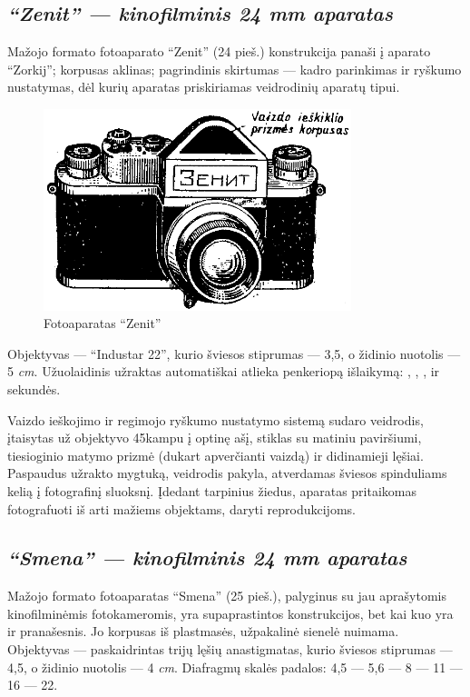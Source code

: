 \documentclass[12pt]{book}
\begin{document}
		\subsection*{\textit{``Zenit'' --- kinofilminis 24  mm aparatas}}
			Mažojo formato fotoaparato ``Zenit'' (24 pieš.) konstrukcija panaši į aparato ``Zorkij''; korpusas aklinas; pagrindinis skirtumas --- kadro parinkimas ir ryškumo nustatymas, dėl kurių aparatas priskiriamas veidrodinių aparatų tipui.
			\begin{figure}[h]
				\centering
				\includegraphics[width=0.8\textwidth]{24-pav}
				\caption{Fotoaparatas ``Zenit''}
				\label{fig:24}
			\end{figure}

			Objektyvas --- ``Industar 22'', kurio šviesos stiprumas --- 3,5, o židinio nuotolis --- 5 \textit{cm}. Užuolaidinis užraktas automatiškai atlieka penkeriopą išlaikymą: , , ,  ir  sekundės.

			Vaizdo ieškojimo ir regimojo ryškumo nustatymo sistemą sudaro veidrodis, įtaisytas už objektyvo 45\degree kampu į optinę ašį, stiklas su matiniu paviršiumi, tiesioginio matymo prizmė (dukart apverčianti vaizdą) ir didinamieji lęšiai. Paspaudus užrakto mygtuką, veidrodis pakyla, atverdamas šviesos spinduliams kelią į fotografinį sluoksnį. Įdedant tarpinius žiedus, aparatas pritaikomas fotografuoti iš arti mažiems objektams, daryti reprodukcijoms.
		\subsection*{\textit{``Smena'' --- kinofilminis 24  mm aparatas}}
			Mažojo formato fotoaparatas ``Smena'' (25 pieš.), palyginus su jau aprašytomis kinofilminėmis fotokameromis, yra supaprastintos konstrukcijos, bet kai kuo yra ir pranašesnis. Jo korpusas iš plastmasės, užpakalinė sienelė nuimama. Objektyvas --- paskaidrintas trijų lęšių anastigmatas, kurio šviesos stiprumas --- 4,5, o židinio nuotolis --- 4 \textit{cm}. Diafragmų skalės padalos: 4,5 --- 5,6 --- 8 --- 11 --- 16 --- 22.
\end{document}
